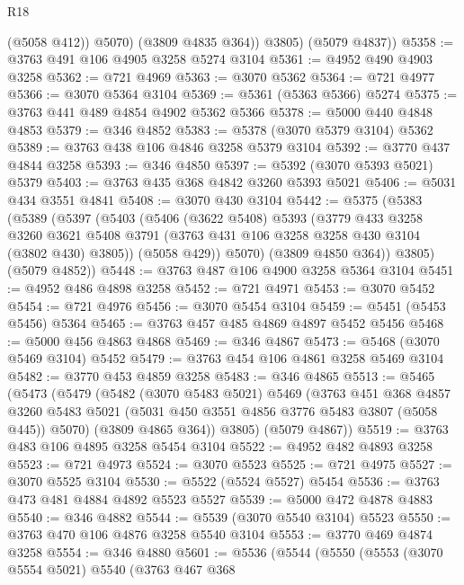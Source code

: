 \begin{lexlean}{R18}
\begin{coremodule}
              (@5058 @412))
            @5070)
          (@3809 @4835 @364))
        @3805)
      (@5079 @4837))
@5358 := @3763 @491 @106 @4905 @3258 @5274 @3104
@5361 := @4952 @490 @4903 @3258
@5362 := @721 @4969
@5363 := @3070 @5362
@5364 := @721 @4977
@5366 := @3070 @5364 @3104
@5369 := @5361 (@5363 @5366) @5274
@5375 := @3763 @441 @489 @4854 @4902 @5362 @5366
@5378 := @5000 @440 @4848 @4853
@5379 := @346 @4852
@5383 := @5378 (@3070 @5379 @3104) @5362
@5389 := @3763 @438 @106 @4846 @3258 @5379 @3104
@5392 := @3770 @437 @4844 @3258
@5393 := @346 @4850
@5397 := @5392 (@3070 @5393 @5021) @5379
@5403 := @3763 @435 @368 @4842 @3260 @5393 @5021
@5406 := @5031 @434 @3551 @4841
@5408 := @3070 @430 @3104
@5442 := @5375
    (@5383
      (@5389
        (@5397
          (@5403
            (@5406
              (@3622 @5408)
              @5393
              (@3779
                @433
                @3258
                @3260
                @3621
                @5408
                @3791
                (@3763 @431 @106 @3258 @3258 @430 @3104 (@3802 @430) @3805))
              (@5058 @429))
            @5070)
          (@3809 @4850 @364))
        @3805)
      (@5079 @4852))
@5448 := @3763 @487 @106 @4900 @3258 @5364 @3104
@5451 := @4952 @486 @4898 @3258
@5452 := @721 @4971
@5453 := @3070 @5452
@5454 := @721 @4976
@5456 := @3070 @5454 @3104
@5459 := @5451 (@5453 @5456) @5364
@5465 := @3763 @457 @485 @4869 @4897 @5452 @5456
@5468 := @5000 @456 @4863 @4868
@5469 := @346 @4867
@5473 := @5468 (@3070 @5469 @3104) @5452
@5479 := @3763 @454 @106 @4861 @3258 @5469 @3104
@5482 := @3770 @453 @4859 @3258
@5483 := @346 @4865
@5513 := @5465
    (@5473
      (@5479
        (@5482
          (@3070 @5483 @5021)
          @5469
          (@3763
            @451
            @368
            @4857
            @3260
            @5483
            @5021
            (@5031 @450 @3551 @4856 @3776 @5483 @3807 (@5058 @445))
            @5070)
          (@3809 @4865 @364))
        @3805)
      (@5079 @4867))
@5519 := @3763 @483 @106 @4895 @3258 @5454 @3104
@5522 := @4952 @482 @4893 @3258
@5523 := @721 @4973
@5524 := @3070 @5523
@5525 := @721 @4975
@5527 := @3070 @5525 @3104
@5530 := @5522 (@5524 @5527) @5454
@5536 := @3763 @473 @481 @4884 @4892 @5523 @5527
@5539 := @5000 @472 @4878 @4883
@5540 := @346 @4882
@5544 := @5539 (@3070 @5540 @3104) @5523
@5550 := @3763 @470 @106 @4876 @3258 @5540 @3104
@5553 := @3770 @469 @4874 @3258
@5554 := @346 @4880
@5601 := @5536
    (@5544
      (@5550
        (@5553
          (@3070 @5554 @5021)
          @5540
          (@3763
            @467
            @368

\end{coremodule}
\end{lexlean}

